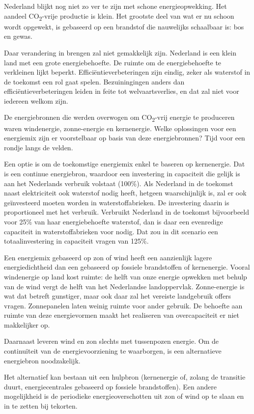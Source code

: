 \documentclass[
  11pt,
  a4paper,
]{book}
\begin{document}
Nederland blijkt nog niet zo ver te zijn met schone energieopwekking. Het aandeel CO\textsubscript{2}-vrije productie is klein. Het grootste deel van wat er nu schoon wordt opgewekt, is gebaseerd op een brandstof die nauwelijks schaalbaar is: bos en gewas.

Daar verandering in brengen zal niet gemakkelijk zijn. Nederland is een klein land met een grote energiebehoefte. De ruimte om de energiebehoefte te verkleinen lijkt beperkt. Efficiëntieverbeteringen zijn eindig, zeker als waterstof in de toekomst een rol gaat spelen. Bezuiningingen anders dan efficiëntieverbeteringen leiden in feite tot welvaartsverlies, en dat zal niet voor iedereen welkom zijn.

De energiebronnen die werden overwogen om CO\textsubscript{2}-vrij energie te produceren waren windenergie, zonne-energie en kernenergie. Welke oplossingen voor een energiemix zijn er voorstelbaar op basis van deze energiebronnen? Tijd voor een rondje langs de velden.

Een optie is om de toekomstige energiemix enkel te baseren op kernenergie. Dat is een continue energiebron, waardoor een investering in capaciteit die gelijk is aan het Nederlands verbruik volstaat (100\%). Als Nederland in de toekomst naast elektriciteit ook waterstof nodig heeft, hetgeen waarschijnlijk is, zal er ook geïnvesteerd moeten worden in waterstoffabrieken. De investering daarin is proportioneel met het verbruik. Verbruikt Nederland in de toekomst bijvoorbeeld voor 25\% van haar energiebehoefte waterstof, dan is daar een evenredige capaciteit in waterstoffabrieken voor nodig. Dat zou in dit scenario een totaalinvestering in capaciteit vragen van 125\%.

Een energiemix gebaseerd op zon of wind heeft een aanzienlijk lagere energiedichtheid dan een gebaseerd op fossiele brandstoffen of kernenergie. Vooral windenergie op land kost ruimte: de helft van onze energie opwekken met behulp van de wind vergt de helft van het Nederlandse landoppervlak. Zonne-energie is wat dat betreft gunstiger, maar ook daar zal het vereiste landgebruik offers vragen. Zonnepanelen laten weinig ruimte voor ander gebruik. De behoefte aan ruimte van deze energievormen maakt het realiseren van overcapaciteit er niet makkelijker op.

Daarnaast leveren wind en zon slechts met tussenpozen energie. Om de continuïteit van de energievoorziening te waarborgen, is een alternatieve energiebron noodzakelijk.

Het alternatief kan bestaan uit een hulpbron (kernenergie of, zolang de transitie duurt, energiecentrales gebaseerd op fossiele brandstoffen). Een andere mogelijkheid is de periodieke energieoverschotten uit zon of wind op te slaan en in te zetten bij tekorten.
\end{document}
